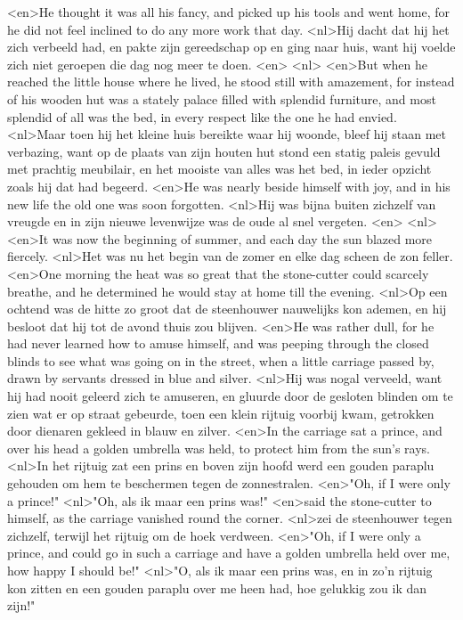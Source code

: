 <en>He thought it was all his fancy, and picked up his tools and went home, for he did not feel inclined to do any more work that day.
<nl>Hij dacht dat hij het zich verbeeld had, en pakte zijn gereedschap op en ging naar huis, want hij voelde zich niet geroepen die dag nog meer te doen.
<en>
<nl>
<en>But when he reached the little house where he lived, he stood still with amazement, for instead of his wooden hut was a stately palace filled with splendid furniture, and most splendid of all was the bed, in every respect like the one he had envied.
<nl>Maar toen hij het kleine huis bereikte waar hij woonde, bleef hij staan met verbazing, want op de plaats van zijn houten hut stond een statig paleis gevuld met prachtig meubilair, en het mooiste van alles was het bed, in ieder opzicht zoals hij dat had begeerd.
<en>He was nearly beside himself with joy, and in his new life the old one was soon forgotten.
<nl>Hij was bijna buiten zichzelf van vreugde en in zijn nieuwe levenwijze was de oude al snel vergeten.
<en>
<nl>
<en>It was now the beginning of summer, and each day the sun blazed more fiercely.
<nl>Het was nu het begin van de zomer en elke dag scheen de zon feller.
<en>One morning the heat was so great that the stone-cutter could scarcely breathe, and he determined he would stay at home till the evening.
<nl>Op een ochtend was de hitte zo groot dat de steenhouwer nauwelijks kon ademen, en hij besloot dat hij tot de avond thuis zou blijven.
<en>He was rather dull, for he had never learned how to amuse himself, and was peeping through the closed blinds to see what was going on in the street, when a little carriage passed by, drawn by servants dressed in blue and silver.
<nl>Hij was nogal verveeld, want hij had nooit geleerd zich te amuseren, en gluurde door de gesloten blinden om te zien wat er op straat gebeurde, toen een klein rijtuig voorbij kwam, getrokken door dienaren gekleed in blauw en zilver.
<en>In the carriage sat a prince, and over his head a golden umbrella was held, to protect him from the sun’s rays.
<nl>In het rijtuig zat een prins en boven zijn hoofd werd een gouden paraplu gehouden om hem te beschermen tegen de zonnestralen.
<en>"Oh, if I were only a prince!"
<nl>"Oh, als ik maar een prins was!"
<en>said the stone-cutter to himself, as the carriage vanished round the corner.
<nl>zei de steenhouwer tegen zichzelf, terwijl het rijtuig om de hoek verdween.
<en>"Oh, if I were only a prince, and could go in such a carriage and have a golden umbrella held over me, how happy I should be!"
<nl>"O, als ik maar een prins was, en in zo'n rijtuig kon zitten en een gouden paraplu over me heen had, hoe gelukkig zou ik dan zijn!"
